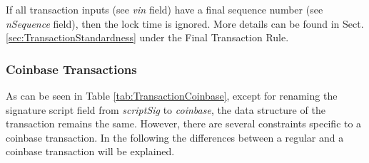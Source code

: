 \noindent
If all transaction inputs (see \textit{vin} field) have a final sequence number (see \mbox{\textit{nSequence}} field), then the lock time is ignored. More details can be found in Sect. \ref{sec:TransactionStandardness} under the Final Transaction Rule.


\clearpage
\subsubsection{Coinbase Transactions} \label{sec:CoinbaseTransactions}
As can be seen in Table \ref{tab:TransactionCoinbase}, except for renaming the signature script field from \textit{scriptSig} to \textit{coinbase}, the data structure of the transaction remains the same. However, there are several constraints specific to a coinbase transaction. In the following the differences between a regular and a coinbase transaction will be explained.
